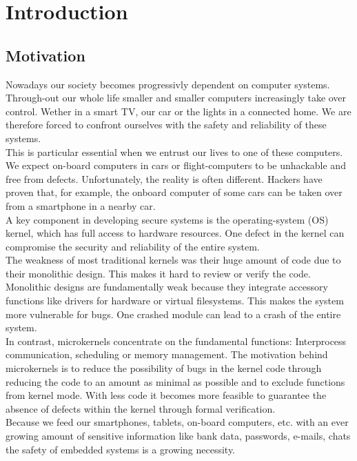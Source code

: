 \chapter{Introduction}
	\section{Motivation}
Nowadays our society becomes progressivly dependent on computer systems. Through-out our whole life smaller and smaller computers increasingly take over control. Wether in a smart TV, our car or the lights in a connected home. We are therefore forced to confront ourselves with the safety and reliability of these systems. \\
This is particular essential when we entrust our lives to one of these computers. We expect on-board computers in cars or flight-computers to be unhackable and free from defects. Unfortunately, the reality is often different. Hackers have proven that, for example, the onboard computer of some cars can be taken over from a smartphone in a nearby car. \\
A key component in developing secure systems is the operating-system (OS) kernel, which has full access to hardware resources. One defect in the kernel can compromise the security and reliability of the entire system. \\
The weakness of most traditional kernels was their huge amount of code due to their monolithic design. This makes it hard to review or verify the code. Monolithic designs are fundamentally weak because they integrate accessory functions like drivers for hardware or virtual filesystems. This makes the system more vulnerable for bugs. One crashed module can lead to a crash of the entire system. \\
In contrast, microkernels concentrate on the fundamental functions: Interprocess communication, scheduling or memory management. The motivation behind microkernels is to reduce the  possibility of bugs in the kernel code through reducing the code to an amount as minimal as possible and to exclude functions from kernel mode. With less code it becomes more feasible to guarantee the absence of defects within the kernel through formal verification.\\
Because we feed our smartphones, tablets, on-board computers, etc. with an ever growing amount of sensitive information like bank data, passwords, e-mails, chats the safety of embedded systems is a growing necessity. \\
